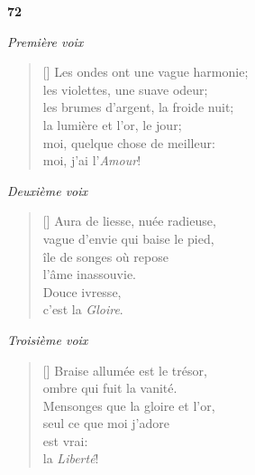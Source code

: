 \documentclass[a4paper,12pt]{book}
\begin{document}
\bigskip

\begin{center}
  \textbf{72}
\end{center}


\begin{center} \emph{Première voix} \end{center}

\begin{verse}[\versewidth]
  Les ondes ont une vague harmonie; \\
  les violettes, une suave odeur; \\
  les brumes d'argent, la froide nuit; \\
  la lumière et l'or, le jour; \\
  moi, quelque chose de meilleur: \\
  moi, j'ai l'\emph{Amour}!
\end{verse}

\smallskip

\begin{center} \emph{Deuxième voix} \end{center}

\begin{verse}[\versewidth]
  Aura de liesse, nuée radieuse, \\
  vague d'envie qui baise le pied, \\
  île de songes où repose \\
  l'âme inassouvie. \\
  Douce ivresse, \\
  c'est la \emph{Gloire}.
\end{verse}

\begin{center} \emph{Troisième voix} \end{center}

\begin{verse}[\versewidth]
  Braise allumée est le trésor, \\
  ombre qui fuit la vanité. \\
  Mensonges que la gloire et l'or, \\
  seul ce que moi j'adore \\
  est vrai: \\
  la \emph{Liberté}!
\end{verse}
\end{document}
